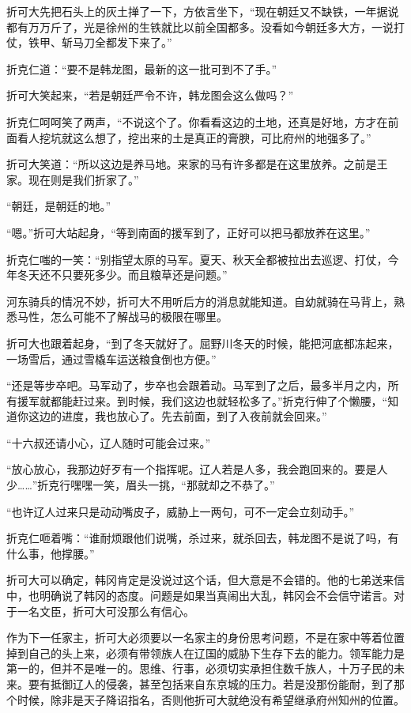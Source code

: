 折可大先把石头上的灰土掸了一下，方依言坐下，“现在朝廷又不缺铁，一年据说都有万万斤了，光是徐州的生铁就比以前全国都多。没看如今朝廷多大方，一说打仗，铁甲、斩马刀全都发下来了。”

折克仁道：“要不是韩龙图，最新的这一批可到不了手。”

折可大笑起来，“若是朝廷严令不许，韩龙图会这么做吗？”

折克仁呵呵笑了两声，“不说这个了。你看看这边的土地，还真是好地，方才在前面看人挖坑就这么想了，挖出来的土是真正的膏腴，可比府州的地强多了。”

折可大笑道：“所以这边是养马地。来家的马有许多都是在这里放养。之前是王家。现在则是我们折家了。”

“朝廷，是朝廷的地。”

“嗯。”折可大站起身，“等到南面的援军到了，正好可以把马都放养在这里。”

折克仁嗤的一笑：“别指望太原的马军。夏天、秋天全都被拉出去巡逻、打仗，今年冬天还不只要死多少。而且粮草还是问题。”

河东骑兵的情况不妙，折可大不用听后方的消息就能知道。自幼就骑在马背上，熟悉马性，怎么可能不了解战马的极限在哪里。

折可大也跟着起身，“到了冬天就好了。屈野川冬天的时候，能把河底都冻起来，一场雪后，通过雪橇车运送粮食倒也方便。”

“还是等步卒吧。马军动了，步卒也会跟着动。马军到了之后，最多半月之内，所有援军就都能赶过来。到时候，我们这边也就轻松多了。”折克行伸了个懒腰，“知道你这边的进度，我也放心了。先去前面，到了入夜前就会回来。”

“十六叔还请小心，辽人随时可能会过来。”

“放心放心，我那边好歹有一个指挥呢。辽人若是人多，我会跑回来的。要是人少……”折克行嘿嘿一笑，眉头一挑，“那就却之不恭了。”

“也许辽人过来只是动动嘴皮子，威胁上一两句，可不一定会立刻动手。”

折克仁咂着嘴：“谁耐烦跟他们说嘴，杀过来，就杀回去，韩龙图不是说了吗，有什么事，他撑腰。”

折可大可以确定，韩冈肯定是没说过这个话，但大意是不会错的。他的七弟送来信中，也明确说了韩冈的态度。问题是如果当真闹出大乱，韩冈会不会信守诺言。对于一名文臣，折可大可没那么有信心。

作为下一任家主，折可大必须要以一名家主的身份思考问题，不是在家中等着位置掉到自己的头上来，必须有带领族人在辽国的威胁下生存下去的能力。领军能力是第一的，但并不是唯一的。思维、行事，必须切实承担住数千族人，十万子民的未来。要有抵御辽人的侵袭，甚至包括来自东京城的压力。若是没那份能耐，到了那个时候，除非是天子降诏指名，否则他折可大就绝没有希望继承府州知州的位置。

